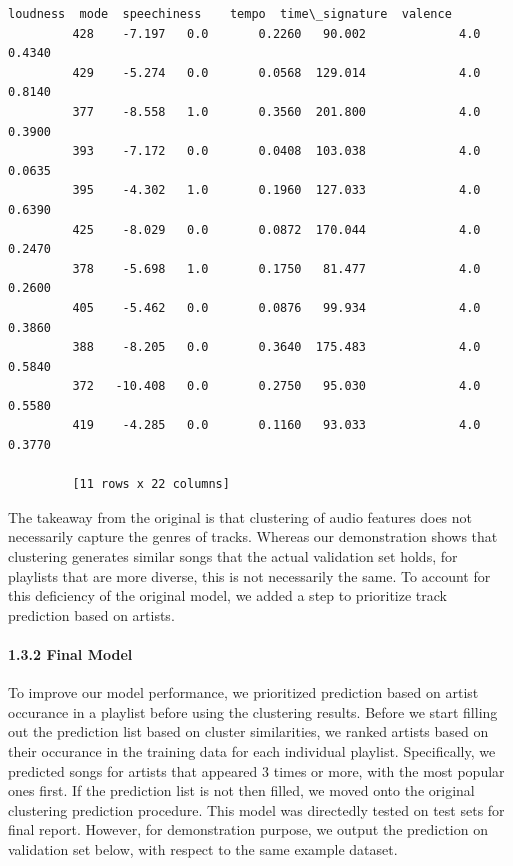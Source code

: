 \documentclass[11pt]{article}
\begin{document}
\begin{Verbatim}[commandchars=\\\{\}]
              loudness  mode  speechiness    tempo  time\_signature  valence  
         428    -7.197   0.0       0.2260   90.002             4.0   0.4340  
         429    -5.274   0.0       0.0568  129.014             4.0   0.8140  
         377    -8.558   1.0       0.3560  201.800             4.0   0.3900  
         393    -7.172   0.0       0.0408  103.038             4.0   0.0635  
         395    -4.302   1.0       0.1960  127.033             4.0   0.6390  
         425    -8.029   0.0       0.0872  170.044             4.0   0.2470  
         378    -5.698   1.0       0.1750   81.477             4.0   0.2600  
         405    -5.462   0.0       0.0876   99.934             4.0   0.3860  
         388    -8.205   0.0       0.3640  175.483             4.0   0.5840  
         372   -10.408   0.0       0.2750   95.030             4.0   0.5580  
         419    -4.285   0.0       0.1160   93.033             4.0   0.3770  
         
         [11 rows x 22 columns]
\end{Verbatim}
            
    The takeaway from the original is that clustering of audio features does
not necessarily capture the genres of tracks. Whereas our demonstration
shows that clustering generates similar songs that the actual validation
set holds, for playlists that are more diverse, this is not necessarily
the same. To account for this deficiency of the original model, we added
a step to prioritize track prediction based on artists.

    \paragraph{1.3.2 Final Model}\label{final-model}

    To improve our model performance, we prioritized prediction based on
artist occurance in a playlist before using the clustering results.
Before we start filling out the prediction list based on cluster
similarities, we ranked artists based on their occurance in the training
data for each individual playlist. Specifically, we predicted songs for
artists that appeared 3 times or more, with the most popular ones first.
If the prediction list is not then filled, we moved onto the original
clustering prediction procedure. This model was directedly tested on
test sets for final report. However, for demonstration purpose, we
output the prediction on validation set below, with respect to the same
example dataset.
\end{document}
